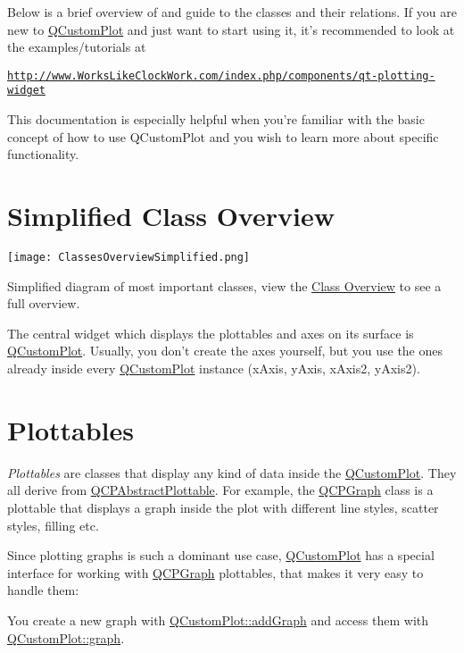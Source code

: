 Below is a brief overview of and guide to the classes and their relations. If you are new to \hyperlink{classQCustomPlot}{Q\-Custom\-Plot} and just want to start using it, it's recommended to look at the examples/tutorials at

\href{http://www.WorksLikeClockWork.com/index.php/components/qt-plotting-widget}{\tt http\-://www.\-Works\-Like\-Clock\-Work.\-com/index.\-php/components/qt-\/plotting-\/widget}

This documentation is especially helpful when you're familiar with the basic concept of how to use Q\-Custom\-Plot and you wish to learn more about specific functionality.\hypertarget{index_simpleoverview}{}\section{Simplified Class Overview}\label{index_simpleoverview}

\begin{DoxyImageNoCaption}
  \mbox{\texttt{[image: ClassesOverviewSimplified.png]}}
\end{DoxyImageNoCaption}
  \begin{center}Simplified diagram of most important classes, view the \hyperlink{classoverview}{Class Overview} to see a full overview.\end{center} 

The central widget which displays the plottables and axes on its surface is \hyperlink{classQCustomPlot}{Q\-Custom\-Plot}. Usually, you don't create the axes yourself, but you use the ones already inside every \hyperlink{classQCustomPlot}{Q\-Custom\-Plot} instance (x\-Axis, y\-Axis, x\-Axis2, y\-Axis2).\hypertarget{index_plottables}{}\section{Plottables}\label{index_plottables}
{\itshape Plottables} are classes that display any kind of data inside the \hyperlink{classQCustomPlot}{Q\-Custom\-Plot}. They all derive from \hyperlink{classQCPAbstractPlottable}{Q\-C\-P\-Abstract\-Plottable}. For example, the \hyperlink{classQCPGraph}{Q\-C\-P\-Graph} class is a plottable that displays a graph inside the plot with different line styles, scatter styles, filling etc.

Since plotting graphs is such a dominant use case, \hyperlink{classQCustomPlot}{Q\-Custom\-Plot} has a special interface for working with \hyperlink{classQCPGraph}{Q\-C\-P\-Graph} plottables, that makes it very easy to handle them\-:\par
 You create a new graph with \hyperlink{classQCustomPlot_a6fb2873d35a8a8089842d81a70a54167}{Q\-Custom\-Plot\-::add\-Graph} and access them with \hyperlink{classQCustomPlot_a6d3ed93c2bf46ab7fa670d66be4cddaf}{Q\-Custom\-Plot\-::graph}.

